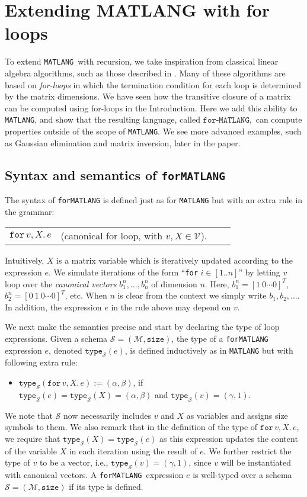 \documentclass[sigconf]{acmart}
\newcommand{\Mnam}{\mathcal{M}}
\newcommand{\Mvar}{\mathcal{V}}
\newcommand{\Sch}{\mathcal{S}}
\newcommand{\size}{\texttt{size}}
\newcommand{\ttype}{\texttt{type}_{\Sch}}
\newcommand{\lang}{\texttt{MATLANG}\xspace}
\newcommand{\langfor}{\texttt{for}\text{-}\texttt{MATLANG}\xspace}
\newcommand{\ffor}[3]{\texttt{for}\, #1,#2 \texttt{.}\, #3}
\begin{document}
\section{Extending MATLANG with for loops}\label{sec:formatlang}
To extend \lang\ with recursion, we take inspiration from classical linear algebra algorithms, such as those described in \cite{num}. Many of these algorithms are based on \textit{for-loops} in which the termination condition for each loop is determined by the matrix dimensions. We have seen how the transitive closure of a matrix can be computed using for-loops in the Introduction. Here we add this ability to \lang, and show that the resulting language, called $\langfor,$ can compute properties outside of the scope of \lang. We see more advanced examples, such as Gaussian elimination and matrix inversion, later in the paper. 

\subsection{Syntax and semantics of \langfor} The syntax of \langfor is defined just as for \lang but with an extra rule in the grammar:
\medskip

\begin{tabular}{lcll}
 $\ffor{v}{X}{e}$ & (canonical for loop, with $v, X \in \Mvar$). 
\end{tabular}

\medskip
\noindent Intuitively, $X$ is a matrix variable which is iteratively updated according to the expression $e$. We simulate iterations of the form ``\texttt{for} $i\in [1..n]$'' by letting $v$ loop over the \textit{canonical vectors} $b_1^n,\ldots,b_n^n$ of dimension $n$. Here,
$b_1^n = [1\ 0 \cdots 0]^T$, $b_2^n = [0\ 1\ 0 \cdots 0]^T$, etc. When $n$ is clear from the context we simply write $b_1,b_2,\ldots$. In addition, the expression $e$ in the rule above may depend on $v$. 

We next make the semantics precise and start by
declaring the type of loop expressions.
Given a schema $\Sch=(\Mnam,\size)$, the type of a \langfor expression $e$, denoted $\ttype(e)$, is defined inductively as in \lang but with following extra rule:
\begin{itemize}
\item $\ttype(\ffor{v}{X}{e}) := (\alpha,\beta)$, if \\
$\ttype(e)=\ttype(X) =(\alpha,\beta)$ and $\ttype(v) = (\gamma,1)$.
\end{itemize}
We note that $\Sch$ now necessarily includes $v$ and $X$ as variables and assigns size symbols to them.
We also remark that in the definition of the type of $\ffor{v}{X}{e}$, we require that $\ttype(X) = \ttype(e)$ as this expression updates the content of the variable $X$ in each iteration using the result of $e$. We further restrict the type of 
$v$ to be a vector, i.e., $\ttype(v)=(\gamma,1)$, since $v$ will be instantiated with canonical vectors.
A \langfor\ expression $e$ is well-typed over a schema $\Sch=(\Mnam,\size)$ if its type is defined. 
\end{document}
